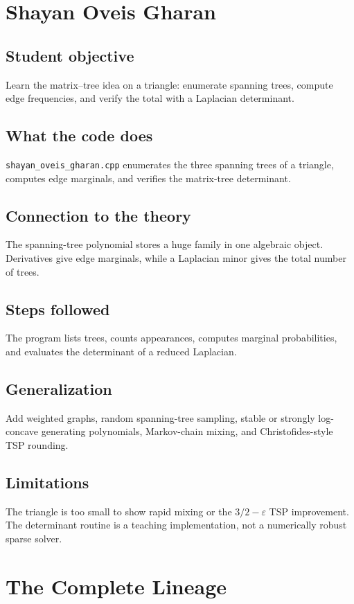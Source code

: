 \documentclass[11pt]{book}
\begin{document}
\chapter{Shayan Oveis Gharan}
\section{Student objective}
Learn the matrix--tree idea on a triangle: enumerate spanning trees, compute edge frequencies, and verify the total with a Laplacian determinant.
\section{What the code does}
\texttt{shayan\_oveis\_gharan.cpp} enumerates the three spanning trees of a triangle, computes edge marginals, and verifies the matrix-tree determinant.

\section{Connection to the theory}
The spanning-tree polynomial stores a huge family in one algebraic object. Derivatives give edge marginals, while a Laplacian minor gives the total number of trees.

\section{Steps followed}
The program lists trees, counts appearances, computes marginal probabilities, and evaluates the determinant of a reduced Laplacian.

\section{Generalization}
Add weighted graphs, random spanning-tree sampling, stable or strongly log-concave generating polynomials, Markov-chain mixing, and Christofides-style TSP rounding.

\section{Limitations}
The triangle is too small to show rapid mixing or the $3/2-\varepsilon$ TSP improvement. The determinant routine is a teaching implementation, not a numerically robust sparse solver.

\chapter{The Complete Lineage}
\end{document}
